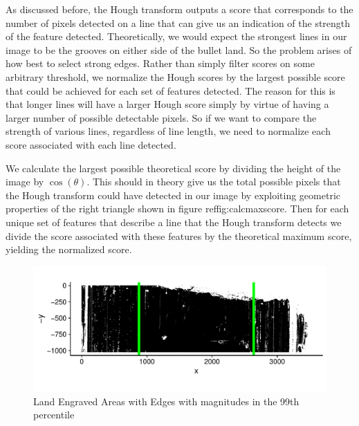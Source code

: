 \documentclass[12pt]{article}\usepackage[]{graphicx}\usepackage[]{color}
\makeatletter
\def\maxwidth{ %
  \ifdim\Gin@nat@width>\linewidth
    \linewidth
  \else
    \Gin@nat@width
  \fi
}
\newenvironment{knitrout}{}{} %
\theoremstyle{nonumberplain}
\makeatother
\begin{document}
As discussed before, the Hough transform outputs a score that corresponds to the number of pixels detected on a line that can give us an indication of the strength of the feature detected. Theoretically, we would expect the strongest lines in our image to be the grooves on either side of the bullet land. So the problem arises of how best to select strong edges. Rather than simply filter scores on some arbitrary threshold, we normalize the Hough scores by the largest possible score that could be achieved for each set of features detected. The reason for this is that longer lines will have a larger Hough score simply by virtue of having a larger number of possible detectable pixels. So if we want to compare the strength of various lines, regardless of line length, we need to normalize each score associated with each line detected.  



We calculate the largest possible theoretical score by dividing the height of the image by $\cos(\theta)$. This should in theory give us the total possible pixels that the Hough transform could have detected in our image by exploiting geometric properties of the right triangle shown in figure ref{fig:calcmaxscore}. Then for each unique set of features that describe a line that the Hough transform detects we divide the score associated with these features by the theoretical maximum score, yielding the normalized score. 

\begin{knitrout}
\color{fgcolor}\begin{figure}

{\centering \includegraphics[width=\maxwidth]{figure/r_middle-fifty-1} 

}

\caption[Land Engraved Areas with Edges with magnitudes in the 99th percentile]{Land Engraved Areas with Edges with magnitudes in the 99th percentile}\label{fig:r middle-fifty}
\end{figure}


\end{knitrout}
\end{document}
